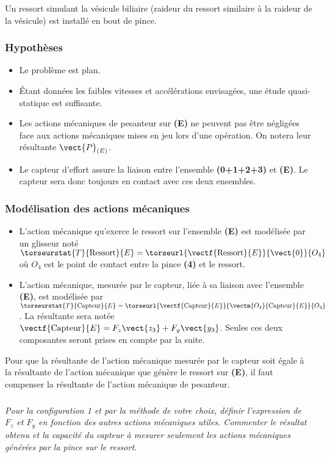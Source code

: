 \begin{multicols}{2}
Un ressort simulant la vésicule biliaire (raideur du ressort similaire à la
raideur de la vésicule) est installé en bout de pince.
\subsubsection*{Hypothèses}
\begin{itemize}
\item Le problème est plan.
\item Étant données les faibles vitesses et accélérations envisagées, une étude quasi-statique est
suffisante.
\item Les actions mécaniques de pesanteur sur \textbf{(E)} ne peuvent pas être négligées face aux actions mécaniques mises en jeu lors d’une opération. On notera leur résultante $\vect{P}_{(E)}$.
\item Le capteur d’effort assure la liaison entre l’ensemble \textbf{(0+1+2+3)} et \textbf{(E)}. Le capteur sera donc toujours en contact avec ces deux ensembles.
\end{itemize}
\subsubsection*{Modélisation des actions mécaniques}
\begin{itemize}
\item L'action mécanique qu’exerce le ressort sur l’ensemble \textbf{(E)} est modélisée par un glisseur noté $\torseurstat{T}{\text{Ressort}}{E}=\torseurl{\vectf{\text{Ressort}}{E}}{\vect{0}}{O_4}$ où $O_4$ est le point de contact entre la pince \textbf{(4)} et le ressort.
\item L'action mécanique, mesurée par le capteur, liée à sa liaison avec l'ensemble
\textbf{(E)}, est modélisée par
$\torseurstat{T}{\text{Capteur}}{E}=\torseurl{\vectf{\text{Capteur}}{E}}{\vectm{O_4}{\text{Capteur}}{E}}{O_4}$. La résultante sera notée $\vectf{\text{Capteur}}{E}=F_z\vect{z_3}+F_y\vect{y_3}$. Seules ces deux composantes seront prises en compte par la suite. 
\end{itemize}

Pour que la résultante de l’action mécanique mesurée par le capteur soit égale à la résultante de l’action mécanique que génère le ressort sur \textbf{(E)}, il faut
compenser la résultante de l’action mécanique de pesanteur.

\fi

\subparagraph{}
\textit{Pour la configuration 1 et par la méthode de votre choix, définir l’expression de $F_z$ et $F_y$ en fonction des autres actions mécaniques utiles. Commenter le résultat obtenu et la capacité du capteur à mesurer seulement les actions mécaniques générées par la pince sur le ressort.}


\end{multicols}

